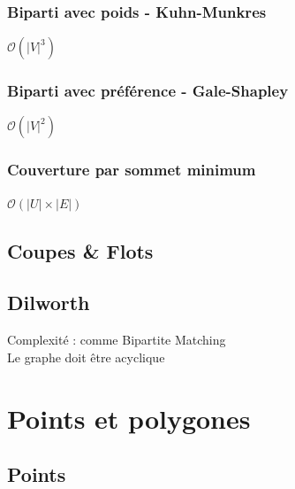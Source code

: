 \documentclass[8pt]{article}
\begin{document}
            \subsubsection{Biparti avec poids - Kuhn-Munkres}
            $\mathcal{O}(\lvert V \rvert ^3)$
            {\scriptsize}
            \subsubsection{Biparti avec préférence - Gale-Shapley}
            $\mathcal{O}(\lvert V \rvert ^2)$
            {\scriptsize}
            \subsubsection{Couverture par sommet minimum}
            $\mathcal{O}(\lvert U \rvert  \times \lvert E \rvert)$
            {\scriptsize}
        \subsection{Coupes \& Flots}
            \subsection{Dilworth}
            Complexité : comme Bipartite Matching\\
            Le graphe doit être acyclique
            {\scriptsize}
    \section{Points et polygones}
        \subsection{Points}
\end{document}
